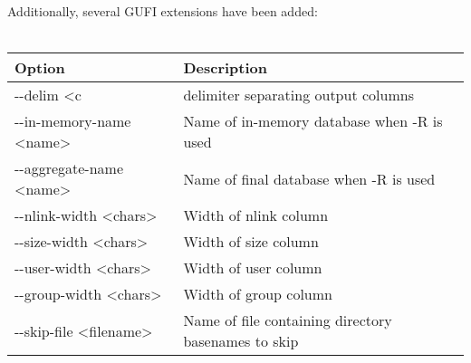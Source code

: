 Additionally, several GUFI extensions have been added:
\\\\
\begin{tabular} {| l | l |}
  \hline
  Option & Description \\
  \hline
  -{}-delim \textless c & delimiter separating output columns \\
  \hline
  -{}-in-memory-name \textless name\textgreater & Name of in-memory
  database when -R is used \\
  \hline
  -{}-aggregate-name \textless name\textgreater & Name of final
  database when -R is used \\
  \hline
  -{}-nlink-width \textless chars\textgreater & Width of nlink column \\
  \hline
  -{}-size-width \textless chars\textgreater & Width of size column \\
  \hline
  -{}-user-width \textless chars\textgreater & Width of user column \\
  \hline
  -{}-group-width \textless chars\textgreater & Width of group column \\
  \hline
  -{}-skip-file \textless filename\textgreater & Name of file containing
  directory basenames to skip \\
  \hline
\end{tabular}
